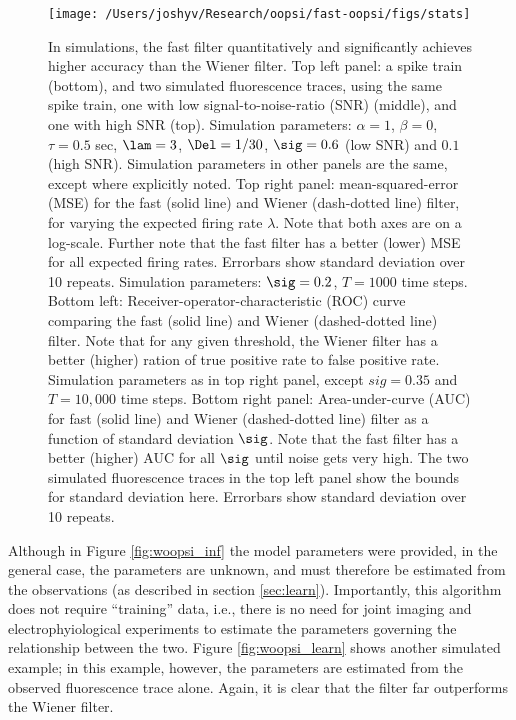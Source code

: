 \begin{figure}[h!]
\centering \texttt{[image: /Users/joshyv/Research/oopsi/fast-oopsi/figs/stats]}
\caption[quantifying the relative accuracy for the fast and Wiener filters]{In simulations, the fast filter quantitatively and significantly achieves higher accuracy than the Wiener filter.  Top left panel: a spike train (bottom), and two simulated fluorescence traces, using the same spike train, one with low signal-to-noise-ratio (SNR) (middle), and one with high SNR (top).  Simulation parameters:  $\alpha=1$, $\beta=0$, $\tau=0.5$ sec, $\lam=3$, $\Del=1/30$, $\sig=0.6$ (low SNR) and $0.1$ (high SNR). Simulation parameters in other panels are the same, except where explicitly noted.  Top right panel: mean-squared-error (MSE) for the fast (solid line) and Wiener (dash-dotted line) filter, for varying the expected firing rate $\lambda$.  Note that both axes are on a log-scale.  Further note that the fast filter has a better (lower) MSE for all expected firing rates. Errorbars show standard deviation over 10 repeats. Simulation parameters: $\sig=0.2$, $T=1000$ time steps. Bottom left: Receiver-operator-characteristic (ROC) curve comparing the fast (solid line) and Wiener (dashed-dotted line) filter. Note that for any given threshold, the Wiener filter has a better (higher) ration of true positive rate to false positive rate. Simulation parameters as in top right panel, except $sig=0.35$ and $T=10,000$ time steps.  Bottom right panel: Area-under-curve (AUC) for fast (solid line) and Wiener (dashed-dotted line) filter as a function of standard deviation $\sig$.  Note that the fast filter has a better (higher) AUC for all $\sig$ until noise gets very high.  The two simulated fluorescence traces in the top left panel show the bounds for standard deviation here.  Errorbars show standard deviation over 10 repeats.} \label{fig:stats}
\end{figure}



Although in Figure \ref{fig:woopsi_inf} the model parameters were provided, in the general case, the parameters are unknown, and must therefore be estimated from the observations (as described in section \ref{sec:learn}). Importantly, this algorithm does not require ``training'' data, i.e., there is no need for joint imaging and electrophyiological experiments to estimate the parameters governing the relationship between the two.  Figure \ref{fig:woopsi_learn} shows another simulated example; in this example, however, the parameters are estimated from the observed fluorescence trace alone.  Again, it is clear that the \foopsi filter far outperforms the Wiener filter.

